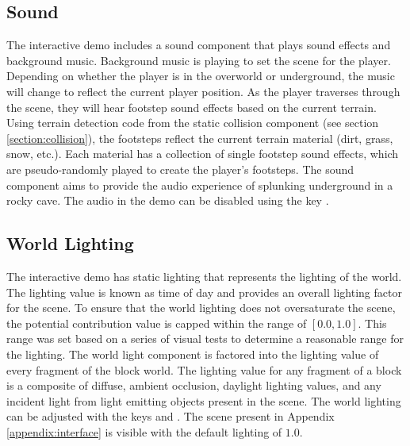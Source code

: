 \documentclass[a4paper,11pt,titlepage]{scrartcl}
\begin{document}
\subsection{Sound}
\label{section:sound}
The interactive demo includes a sound component that plays sound effects and background music. Background music is playing to set the scene for the player. Depending on whether the player is in the overworld or underground, the music will change to reflect the current player position. As the player traverses through the scene, they will hear footstep sound effects based on the current terrain. Using terrain detection code from the static collision component (see section \ref{section:collision}), the footsteps reflect the current terrain material (dirt, grass, snow, etc.). Each material has a collection of single footstep sound effects, which are pseudo-randomly played to create the player's footsteps. The sound component aims to provide the audio experience of splunking underground in a rocky cave.
\vskip 2.5mm\noindent
The audio in the demo can be disabled using the key .
    
\subsection{World Lighting}
\label{section:lighting}
The interactive demo has static lighting that represents the lighting of the world. The lighting value is known as time of day and provides an overall lighting factor for the scene. To ensure that the world lighting does not oversaturate the scene, the potential contribution value is capped within the range of $[0.0, 1.0]$. This range was set based on a series of visual tests to determine a reasonable range for the lighting. The world light component is factored into the lighting value of every fragment of the block world. The lighting value for any fragment of a block is a composite of diffuse, ambient occlusion, daylight lighting values, and any incident light from light emitting objects present in the scene. 
\vskip 2.5mm\noindent
The world lighting can be adjusted with the keys  and . The scene present in Appendix \ref{appendix:interface} is visible with the default lighting of $1.0$.
    
\end{document}
